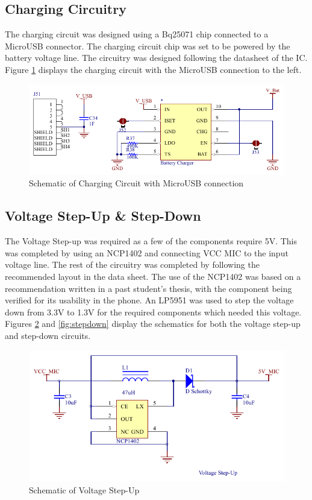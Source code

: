 \subsection{Charging Circuitry}

	The charging circuit was designed using a Bq25071 chip connected to a MicroUSB connector. 
The charging circuit chip was set to be powered by the battery voltage line. The circuitry was designed following the datasheet of the IC.
Figure \ref{fig:charger} displays the charging circuit with the MicroUSB connection to the left. 

\begin{figure}
	\includegraphics[width=0.5\linewidth]{Figures/battery_charger.pdf}\centering
	\caption{Schematic of Charging Circuit with MicroUSB connection}
	\label{fig:charger}
\end{figure}

\subsection{Voltage Step-Up \& Step-Down}

	The Voltage Step-up was required as a few of the components require 5V. 
This was completed by using an NCP1402 and connecting VCC MIC to the input voltage line. 
The rest of the circuitry was completed by following the recommended layout in the data sheet. 
The use of the NCP1402 was based on a recommendation written in a past student's thesis, with the component being verified for its usability in the phone. 
An LP5951 was used to step the voltage down from 3.3V to 1.3V for the required components which needed this voltage. 
Figures \ref{fig:stepup} and \ref{fig:stepdown} display the schematics for both the voltage step-up and step-down circuits.

\begin{figure}
	\includegraphics[width=0.5\linewidth]{Figures/voltage_stepup.pdf}\centering
	\caption{Schematic of Voltage Step-Up}
	\label{fig:stepup}
\end{figure}

